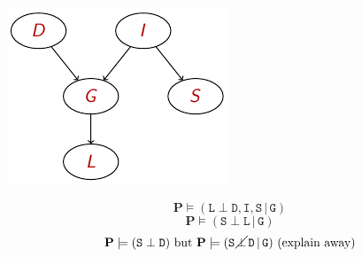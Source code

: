 \begin{description}
\begin{example}
            \begin{minipage}{.3\linewidth}
                \centering
                \includegraphics[width=0.75\linewidth]{img/_independence_example.pdf}
            \end{minipage}
            \begin{minipage}{.6\linewidth}
                \[ \textbf{P} \models (\texttt{L} \perp \texttt{D}, \texttt{I}, \texttt{S} \,\vert\, \texttt{G}) \]
                \[ \textbf{P} \models (\texttt{S} \perp \texttt{L} \,\vert\, \texttt{G}) \]
                \[ \textbf{P} \models (\texttt{S} \perp \texttt{D}) \text{ but } 
                    \textbf{P} \models (\texttt{S} \,\cancel{\perp}\, \texttt{D} \,\vert\, \texttt{G}) \text{ (explain away)} \]
            \end{minipage}
        \end{example}
\end{description}